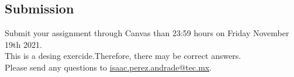 \documentclass[number=03]{assignment}
\newcommand{\deadline}{23:59 hours on Friday November 19th 2021}
\begin{document}
\subsection{Submission}
Submit your assignment through Canvas  than \deadline. 
\\

 This is a desing exercide.Therefore, there may be  correct answers.
\\

Please send any questions to \href{mailto:isaac.perez.andrade@tec.mx}{isaac.perez.andrade@tec.mx}.
\end{document}
